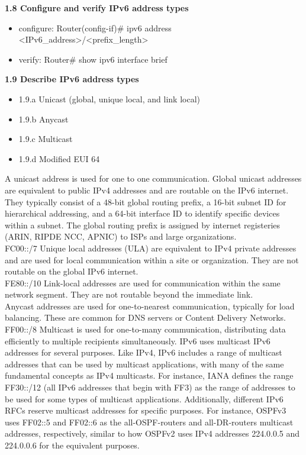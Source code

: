 \documentclass{article}
\begin{document}
\noindent\textbf{1.8 Configure and verify IPv6 address types}
\begin{itemize}
\item configure: Router(config-if)\# ipv6 address \textless IPv6\_address\textgreater/\textless prefix\_length\textgreater
\item verify: Router\# show ipv6 interface brief
 \end{itemize}
  
\noindent\textbf{1.9 Describe IPv6 address types}
\begin{itemize}
\item 1.9.a Unicast (global, unique local, and link local)
\item 1.9.b Anycast
\item 1.9.c Multicast
\item 1.9.d Modified EUI 64
\end{itemize}

	A unicast address is used for one to one communication. Global unicast addresses are equivalent to public IPv4 addresses and are routable on the IPv6 internet. They typically consist of a 48-bit global routing prefix, a 16-bit subnet ID for hierarchical addressing, and a 64-bit interface ID to identify specific devices within a subnet. The global routing prefix is assigned by internet registeries (ARIN, RIPDE NCC, APNIC) to ISPs and large organizations.\\
	
	 FC00::/7 Unique local addresses (ULA) are equivalent to IPv4 private addresses and are used for local communication within a site or organization. They are not routable on the global IPv6 internet.\\
	 
	  FE80::/10 Link-local addresses are used for communication within the same network segment. They are not routable beyond the immediate link.\\
	  
	  Anycast addresses are used for one-to-nearest communication, typically for load balancing. These are common for DNS servers or Content Delivery Networks.\\
	
	 FF00::/8 Multicast is used for one-to-many communication, distributing data efficiently to multiple recipients simultaneously. IPv6 uses multicast IPv6 addresses for several purposes. Like IPv4, IPv6 includes a range of multicast addresses that can be used by multicast applications, with many of the same fundamental concepts as IPv4 multicasts. For instance, IANA defines the range FF30::/12 (all IPv6 addresses that begin with FF3) as the range of addresses to be used for some types of multicast applications. Additionally, different IPv6 RFCs reserve multicast addresses for specific purposes. For instance, OSPFv3 uses FF02::5 and FF02::6 as the all-OSPF-routers and all-DR-routers multicast addresses, respectively, similar to how OSPFv2 uses IPv4 addresses 224.0.0.5 and 224.0.0.6 for the equivalent purposes.\\
	 
\end{document}

